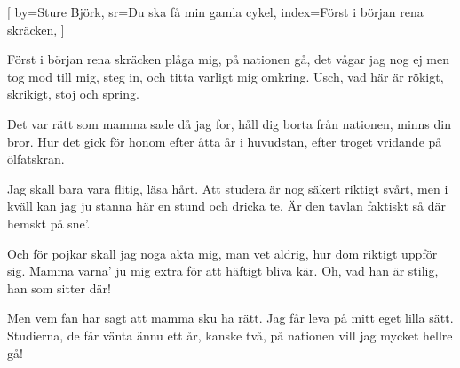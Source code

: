 
[
	by={Sture Björk},
	sr={Du ska få min gamla cykel},
	index={Först i början rena skräcken},
	]

\beginverse*
Först i början rena skräcken plåga mig,
på nationen gå, det vågar jag nog ej
men tog mod till mig, steg in,
och titta varligt mig omkring.
Usch, vad här är rökigt, skrikigt, stoj och spring.
\endverse

\beginverse*
Det var rätt som mamma sade då jag for,
håll dig borta från nationen, minns din bror.
Hur det gick för honom
efter åtta år i huvudstan,
efter troget vridande på ölfatskran.
\endverse

\beginverse*
Jag skall bara vara flitig, läsa hårt.
Att studera är nog säkert riktigt svårt,
men i kväll kan jag ju stanna här en stund
och dricka te.
Är den tavlan faktiskt så där hemskt på sne'.
\endverse

\beginverse*
Och för pojkar skall jag noga akta mig,
man vet aldrig, hur dom riktigt uppför sig.
Mamma varna' ju mig extra
för att häftigt bliva kär.
Oh, vad han är stilig, han som sitter där!
\endverse

\beginverse*
Men vem fan har sagt att mamma sku ha rätt.
Jag får leva på mitt eget lilla sätt.
Studierna, de får vänta ännu ett år, kanske två,
på nationen vill jag mycket hellre gå!
\endverse
\endsong